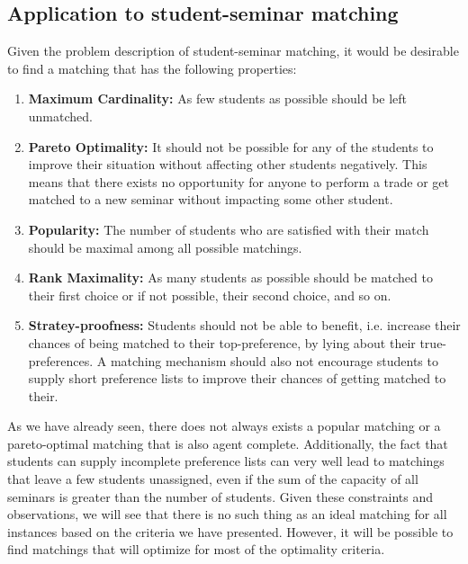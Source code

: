 \subsection{Application to student-seminar matching}\label{criteria-application}
Given the problem description of student-seminar matching, it would be desirable to find a matching that has the following properties:
\begin{enumerate}
    \item \textbf{Maximum Cardinality:} As few students as possible should be left unmatched.
    \item \textbf{Pareto Optimality:} It should not be possible for any of the students to improve their situation without affecting other students negatively. This means that there exists no opportunity for anyone to perform a trade or get matched to a new seminar without impacting some other student.
    \item \textbf{Popularity:} The number of students who are satisfied with their match should be maximal among all possible matchings.
    \item \textbf{Rank Maximality:} As many students as possible should be matched to their first choice or if not possible, their second choice, and so on.
    \item \textbf{Stratey-proofness:} Students should not be able to benefit, i.e. increase their chances of being matched to their top-preference, by lying about their true-preferences. A matching mechanism should also not encourage students to supply short preference lists to improve their chances of getting matched to their.
\end{enumerate}
As we have already seen, there does not always exists a popular matching or a pareto-optimal matching that is also agent complete. Additionally, the fact that students can supply incomplete preference lists can very well lead to matchings that leave a few students unassigned, even if the sum of the capacity of all seminars is greater than the number of students. Given these constraints and observations, we will see that there is no such thing as an ideal matching for all instances based on the criteria we have presented. However, it will be possible to find matchings that will optimize for most of the optimality criteria.